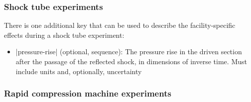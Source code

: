 \documentclass[12pt]{ijck}
\begin{document}
\subsubsection{Shock tube experiments}
\label{sec:shock-tube-experiments}

There is one additional key that can be used to describe the facility-specific effects during a
shock tube experiment:
%
\begin{itemize}
    \item \yabox|pressure-rise| (optional, sequence): The pressure rise in the driven section after
    the passage of the reflected shock, in dimensions of inverse time. Must include units and,
    optionally, uncertainty
\end{itemize}

\subsubsection{Rapid compression machine experiments}
\label{sec:rcm-experiments}
\end{document}
